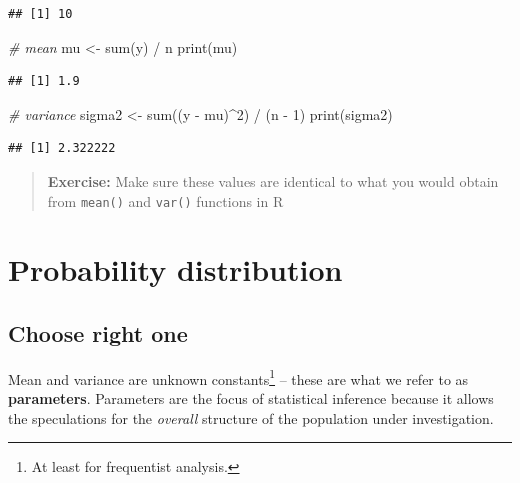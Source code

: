 \documentclass[
]{book}
\newenvironment{Shaded}{\begin{snugshade}}{\end{snugshade}}
\newcommand{\CommentTok}[1]{\textcolor[rgb]{0.56,0.35,0.01}{\textit{#1}}}
\newcommand{\DecValTok}[1]{\textcolor[rgb]{0.00,0.00,0.81}{#1}}
\newcommand{\FunctionTok}[1]{\textcolor[rgb]{0.00,0.00,0.00}{#1}}
\newcommand{\NormalTok}[1]{#1}
\newcommand{\OtherTok}[1]{\textcolor[rgb]{0.56,0.35,0.01}{#1}}
\newcommand{\SpecialCharTok}[1]{\textcolor[rgb]{0.00,0.00,0.00}{#1}}
\begin{document}
\begin{verbatim}
## [1] 10
\end{verbatim}

\begin{Shaded}
\begin{Highlighting}[]
\CommentTok{\# mean}
\NormalTok{mu }\OtherTok{\textless{}{-}} \FunctionTok{sum}\NormalTok{(y) }\SpecialCharTok{/}\NormalTok{ n}
\FunctionTok{print}\NormalTok{(mu)}
\end{Highlighting}
\end{Shaded}

\begin{verbatim}
## [1] 1.9
\end{verbatim}

\begin{Shaded}
\begin{Highlighting}[]
\CommentTok{\# variance}
\NormalTok{sigma2 }\OtherTok{\textless{}{-}} \FunctionTok{sum}\NormalTok{((y }\SpecialCharTok{{-}}\NormalTok{ mu)}\SpecialCharTok{\^{}}\DecValTok{2}\NormalTok{) }\SpecialCharTok{/}\NormalTok{ (n }\SpecialCharTok{{-}} \DecValTok{1}\NormalTok{)}
\FunctionTok{print}\NormalTok{(sigma2)}
\end{Highlighting}
\end{Shaded}

\begin{verbatim}
## [1] 2.322222
\end{verbatim}

\begin{quote}
\textbf{Exercise:} Make sure these values are identical to what you would obtain from \texttt{mean()} and \texttt{var()} functions in R
\end{quote}

\hypertarget{probability-distribution}{%
\section{Probability distribution}\label{probability-distribution}}

\hypertarget{choose-right-one}{%
\subsection{Choose right one}\label{choose-right-one}}

Mean and variance are unknown constants\footnote{At least for frequentist analysis.} -- these are what we refer to as \textbf{parameters}. Parameters are the focus of statistical inference because it allows the speculations for the \emph{overall} structure of the population under investigation.
\end{document}
